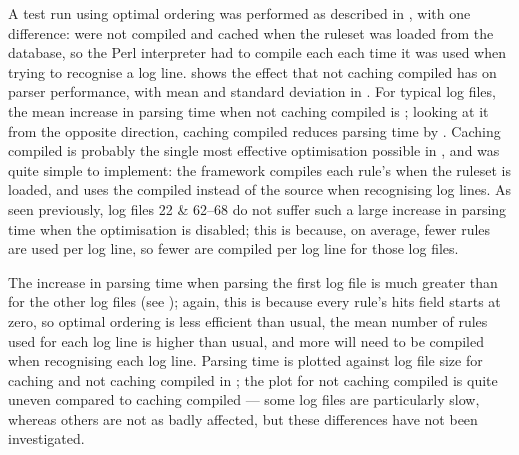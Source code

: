 A test run using optimal ordering was performed as described in
, with one difference: \regexes{} were not
compiled and cached when the ruleset was loaded from the database, so the
Perl interpreter had to compile each  each time it was used
when trying to recognise a log line.   shows the effect that
not caching compiled \regexes{} has on parser performance, with mean and
standard deviation in .  For typical log files, the mean
increase in parsing time when not caching compiled \regexes{} is
; looking at
it from the opposite direction, caching compiled \regexes{} reduces parsing
time by
.
Caching compiled \regexes{} is probably the single most effective
optimisation possible in \parsername{}, and was quite simple to implement:
the framework compiles each rule's  when the ruleset is
loaded, and uses the compiled  instead of the source
 when recognising log lines.  As seen previously, log files
22 \& 62--68 do not suffer such a large increase in parsing time when the
optimisation is disabled; this is because, on average, fewer rules are used
per log line, so fewer \regexes{} are compiled per log line for those log
files.

The increase in parsing time when parsing the first log file is much
greater than for the other log files (see ); again, this is
because every rule's hits field starts at zero, so optimal ordering is less
efficient than usual, the mean number of rules used for each log line is
higher than usual, and more \regexes{} will need to be compiled when
recognising each log line.  Parsing time is plotted against log file size
for caching and not caching compiled \regexes{} in ; the plot for not caching compiled \regexes{} is quite uneven
compared to caching compiled \regexes{} --- some log files are particularly
slow, whereas others are not as badly affected, but these differences have
not been investigated.


